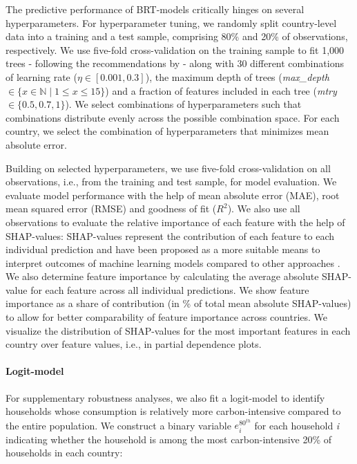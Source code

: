 \documentclass[12pt, a4paper]{article}
\begin{document}
The predictive performance of BRT-models critically hinges on several hyperparameters. For hyperparameter tuning, we randomly split country-level data into a training and a test sample, comprising 80\% and 20\% of observations, respectively. We use five-fold cross-validation on the training sample to fit 1,000 trees - following the recommendations by \textcite{Elith.2008} - along with 30 different combinations of learning rate ($\eta \in [0.001,0.3]$), the maximum depth of trees (\textit{max\_depth} $\in \{x \in \mathbb{N} \mid 1  \leq x \leq 15 \}$) and a fraction of features included in each tree (\textit{mtry} $\in \{0.5,0.7,1\}$). We select combinations of hyperparameters such that combinations distribute evenly across the possible combination space. For each country, we select the combination of hyperparameters that minimizes mean absolute error.

Building on selected hyperparameters, we use five-fold cross-validation on all observations, i.e., from the training and test sample, for model evaluation. We evaluate model performance with the help of mean absolute error (MAE), root mean squared error (RMSE) and goodness of fit ($R^{2}$). We also use all observations to evaluate the relative importance of each feature with the help of SHAP-values: SHAP-values represent the contribution of each feature to each individual prediction and have been proposed as a more suitable means to interpret outcomes of machine learning models compared to other approaches \autocite{Lundberg.2020}. We also determine feature importance by calculating the average absolute SHAP-value for each feature across all individual predictions. We show feature importance as a share of contribution (in \% of total mean absolute SHAP-values) to allow for better comparability of feature importance across countries. We visualize the distribution of SHAP-values for the most important features in each country over feature values, i.e., in partial dependence plots. 

\paragraph{Logit-model} For supplementary robustness analyses, we also fit a logit-model to identify households whose consumption is relatively more carbon-intensive compared to the entire population. We construct a binary variable $e_{i}^{80^{th}}$ for each household \textit{i} indicating whether the household is among the most carbon-intensive 20\% of households in each country:
\end{document}
